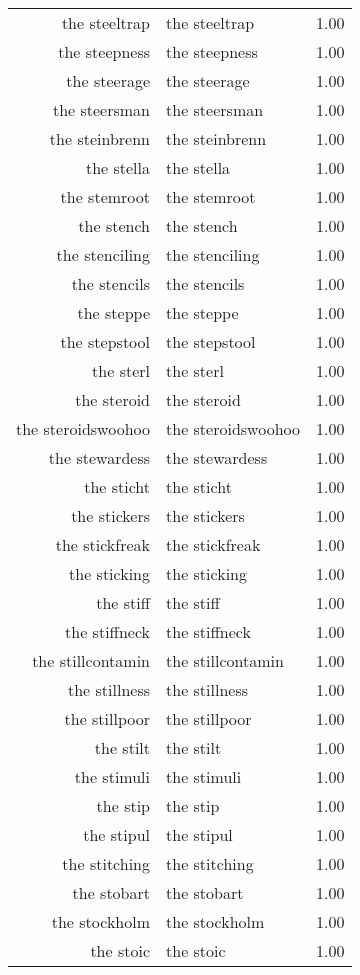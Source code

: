 \begin{table}[ht]
\begin{tabular}{rlr}
  the steeltrap & the steeltrap & 1.00 \\ 
  the steepness & the steepness & 1.00 \\ 
  the steerage & the steerage & 1.00 \\ 
  the steersman & the steersman & 1.00 \\ 
  the steinbrenn & the steinbrenn & 1.00 \\ 
  the stella & the stella & 1.00 \\ 
  the stemroot & the stemroot & 1.00 \\ 
  the stench & the stench & 1.00 \\ 
  the stenciling & the stenciling & 1.00 \\ 
  the stencils & the stencils & 1.00 \\ 
  the steppe & the steppe & 1.00 \\ 
  the stepstool & the stepstool & 1.00 \\ 
  the sterl & the sterl & 1.00 \\ 
  the steroid & the steroid & 1.00 \\ 
  the steroidswoohoo & the steroidswoohoo & 1.00 \\ 
  the stewardess & the stewardess & 1.00 \\ 
  the sticht & the sticht & 1.00 \\ 
  the stickers & the stickers & 1.00 \\ 
  the stickfreak & the stickfreak & 1.00 \\ 
  the sticking & the sticking & 1.00 \\ 
  the stiff & the stiff & 1.00 \\ 
  the stiffneck & the stiffneck & 1.00 \\ 
  the stillcontamin & the stillcontamin & 1.00 \\ 
  the stillness & the stillness & 1.00 \\ 
  the stillpoor & the stillpoor & 1.00 \\ 
  the stilt & the stilt & 1.00 \\ 
  the stimuli & the stimuli & 1.00 \\ 
  the stip & the stip & 1.00 \\ 
  the stipul & the stipul & 1.00 \\ 
  the stitching & the stitching & 1.00 \\ 
  the stobart & the stobart & 1.00 \\ 
  the stockholm & the stockholm & 1.00 \\ 
  the stoic & the stoic & 1.00 \\ 

\end{tabular}
\end{table}

